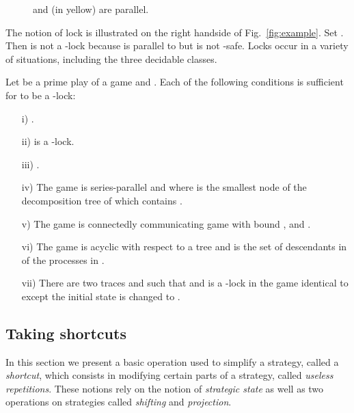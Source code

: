 \documentclass[a4paper,UKenglish]{lipics-v2016}
\begin{document}
\begin{figure}
\caption{\label{fig:lock}
 and  (in yellow) are parallel.
}
\end{figure}
\fi

The notion of lock is illustrated on
the right handside of Fig.~\ref{fig:example}.
Set .
Then
 is not a -lock because 
 is parallel to 
but  is
not -safe.
Locks occur in a variety of situations,
including the three decidable classes.


\begin{lemma}
\label{lem:lock}
Let  be a prime play of a game  and .
Each of the following conditions is sufficient for  to be a -lock:
\begin{itemize}
\item[i)]
.
\item[ii)]
  is a -lock.
\item[iii)]
.
\item[iv)]
The game is series-parallel and 
where  is the smallest node of the decomposition tree of  which contains
.
\item[v)]
The game is connectedly communicating game with bound ,  and .
\item[vi)]
The game is acyclic with respect to a tree 
and  is the set of descendants in 
of the processes in .
\item[vii)]
There are two traces  and  such that  and   is a -lock
in the game  identical to  except  the initial state is changed to .
\end{itemize}
\end{lemma}







\subsection{Taking shortcuts}

In this section we present a basic operation
used to simplify a strategy, called a \emph{shortcut},
which consists in modifying certain parts of a strategy,
called \emph{useless repetitions}.
These notions rely on the notion of \emph{strategic state} as well as two operations on strategies called \emph{shifting} and \emph{projection}.
\end{document}
